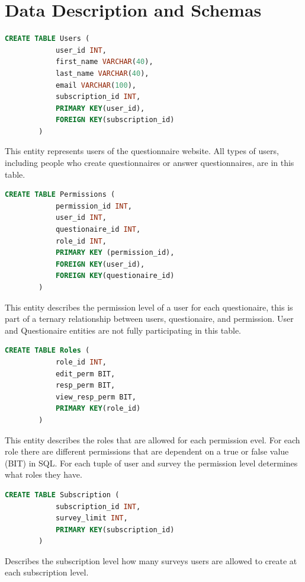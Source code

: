 \documentclass[12pt, oneside, a4paper]{article}
\begin{document}
    \newpage
    \section{Data Description and Schemas}
    \begin{lstlisting}[language=SQL, columns=flexible]
        CREATE TABLE Users (
            user_id INT,
            first_name VARCHAR(40),
            last_name VARCHAR(40),
            email VARCHAR(100),
            subscription_id INT, 
            PRIMARY KEY(user_id),
            FOREIGN KEY(subscription_id)
        ) 
    \end{lstlisting}
    This entity represents users of the questionnaire website.
    All types of users, including people who create questionnaires
    or answer questionnaires, are in this table.
    \\

    \begin{lstlisting}[language=SQL, columns=flexible]
        CREATE TABLE Permissions (
            permission_id INT,
            user_id INT,
            questionaire_id INT,
            role_id INT,
            PRIMARY KEY (permission_id),
            FOREIGN KEY(user_id),
            FOREIGN KEY(questionaire_id)
        ) 
    \end{lstlisting}
    This entity describes the permission level of a user for each 
    questionaire, this is part of a ternary relationship between users, questionaire, and permission. User and Questionaire entities are not fully participating in this table. 
    \\
    
    \begin{lstlisting}[language=SQL, columns=flexible]
        CREATE TABLE Roles (
            role_id INT,
            edit_perm BIT, 
            resp_perm BIT,
            view_resp_perm BIT,
            PRIMARY KEY(role_id)
        ) 
    \end{lstlisting}
    This entity describes the roles that are allowed for each permission evel. For each role there are different permissions that are dependent on a true or false value (BIT) in SQL. For each tuple of user and survey the permission level determines what roles they have.
    \\

    \begin{lstlisting}[language=SQL, columns=flexible]
        CREATE TABLE Subscription (
            subscription_id INT,
            survey_limit INT, 
            PRIMARY KEY(subscription_id)
        ) 
    \end{lstlisting}
    Describes the subscription level how many surveys users are allowed to create at each subscription level. 
    \\
\end{document}
